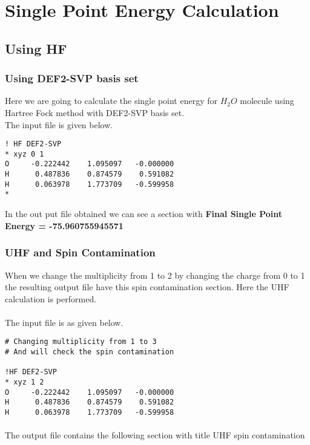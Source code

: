 \section{Single Point Energy Calculation}
\subsection{Using HF}
\subsubsection{Using DEF2-SVP basis set}
Here we are going to calculate the single point energy for $H_2O$ molecule using Hartree Fock method with DEF2-SVP basis \vspace{1cm}set.\\
The input file is given below.
\begin{verbatim}
! HF DEF2-SVP
* xyz 0 1
O     -0.222442    1.095097   -0.000000
H      0.487836    0.874579    0.591082
H      0.063978    1.773709   -0.599958
*
\end{verbatim}

In the out put file obtained we can see a section with \textbf{Final Single Point Energy = -75.960755945571}

\subsubsection{UHF and Spin Contamination}
When we change the multiplicity from 1 to 2 by changing the charge from 0 to 1 the resulting output file have this spin contamination section. Here the UHF calculation is performed.
\paragraph{}

The input file is as given below.

\begin{verbatim}
# Changing multiplicity from 1 to 3 
# And will check the spin contamination

!HF DEF2-SVP
* xyz 1 2
O     -0.222442    1.095097   -0.000000
H      0.487836    0.874579    0.591082
H      0.063978    1.773709   -0.599958

\end{verbatim}

\paragraph{}
The output file contains the following section with title UHF spin contamination\\

